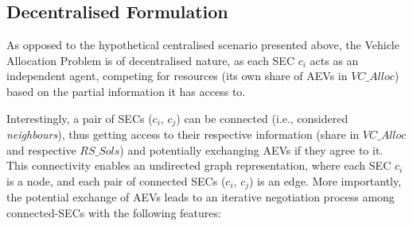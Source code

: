 \subsection{Decentralised Formulation}
\label{ccis_decentralised_formulation}

As opposed to the hypothetical centralised scenario presented above, the Vehicle Allocation Problem is
of decentralised nature, as each SEC $c_i$ acts as an independent agent, competing for resources
(its own share of AEVs in $VC\_Alloc$) based on the
partial information it has access to.

Interestingly, a pair of SECs ($c_i$, $c_j$) can
be connected (i.e., considered \textit{neighbours}), thus getting access to their respective information
(share in $VC\_Alloc$ and respective $RS\_Sols$) and
potentially exchanging AEVs if they agree to it.
This connectivity enables an undirected graph representation,
where each SEC $c_i$ is a node, and each pair of connected SECs ($c_i$, $c_j$) is an edge.
More importantly, the potential exchange of AEVs leads to
an iterative negotiation process among connected-SECs with the following features:

